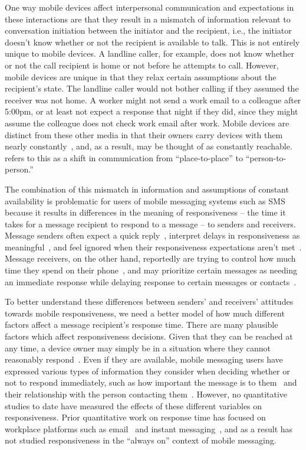 \documentclass[12pt]{nuthesis}	%
\begin{document}
One way mobile devices affect interpersonal communication and expectations in these interactions are that they result in a mismatch of information relevant to conversation initiation between the initiator and the recipient, i.e., the initiator doesn't know whether or not the recipient is available to talk. This is not entirely unique to mobile devices. A landline caller, for example, does not know whether or not the call recipient is home or not before he attempts to call. However, mobile devices are unique in that they relax certain assumptions about the recipient's state. The landline caller would not bother calling if they assumed the receiver was not home. A worker might not send a work email to a colleague after 5:00pm, or at least not expect a response that night if they did, since they might assume the colleague does not check work email after work. Mobile devices are distinct from these other media in that their owners carry devices with them nearly constantly~\citep{oksman2003perhaps,rainie2015americans,turkle2008always}, and, as a result, may be thought of as constantly reachable. \citet{wellman2001computer} refers to this as a shift in communication from ``place-to-place'' to ``person-to-person.''

The combination of this mismatch in information and assumptions of constant availability is problematic for users of mobile messaging systems such as SMS because it results in differences in the meaning of responsiveness -- the time it takes for a message recipient to respond to a message -- to senders and receivers. Message senders often expect a quick reply~\citep{laursen2005please}, interpret delays in responsiveness as meaningful~\citep{rettie2009mobile}, and feel ignored when their responsiveness expectations aren't met~\citep{church2013s}. Message receivers, on the other hand, reportedly are trying to control how much time they spend on their phone~\citep{ames2013managing,smith2015us}, and may prioritize certain messages as needing an immediate response while delaying response to certain messages or contacts~\citep{cui2016beyond,wohn2015ambient}.

To better understand these differences between senders' and receivers' attitudes towards mobile responsiveness, we need a better model of how much different factors affect a message recipient's response time. There are many plausible factors which affect responsiveness decisions. Given that they can be reached at any time, a device owner may simply be in a situation where they cannot reasonably respond~\citep{avrahami2007improving}. Even if they are available, mobile messaging users have expressed various types of information they consider when deciding whether or not to respond immediately, such as how important the message is to them~\citep{cui2016beyond} and their relationship with the person contacting them~\citep{wohn2015ambient}. However, no quantitative studies to date have measured the effects of these different variables on responsiveness. Prior quantitative work on response time has focused on workplace platforms such as email~\citep{dabbish2005understanding} and instant messaging~\citep{avrahami2006responsiveness,avrahami2008waiting}, and as a result has not studied responsiveness in the ``always on'' context of mobile messaging.
\end{document}
